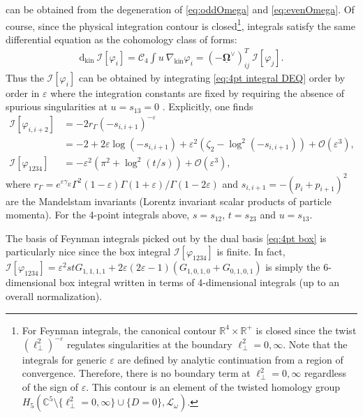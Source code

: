 \documentclass[11pt]{article}
\renewcommand{\d}{\text{d}}
\newcommand{\nn}{\nonumber}
\renewcommand{\O}{\mathcal{O}}
\newcommand{\vphi}{\varphi}
\newcommand{\vep}{\varepsilon}
\newcommand{\mat}[1]{\underline{\boldsymbol{#1}}}
\begin{document}
can be obtained from the degeneration of \eqref{eq:oddOmega} and \eqref{eq:evenOmega}. 
Of course, since the physical integration contour is closed\footnote{For Feynman integrals, the canonical contour $\mathbb{R}^4\times\mathbb{R}^+$ is closed since the twist $(\ell^2_\perp)^{-\vep}$ regulates singularities at the boundary $\ell_\perp^2=0,\infty$. Note that the integrals for generic $\vep$ are defined by analytic continuation from a region of convergence. Therefore, there is no boundary term at $\ell_\perp^2=0,\infty$ regardless of the sign of $\vep$. This contour is an element of the twisted homology group $H_5(\mathbb{C}^5\setminus\{\ell_\perp^2=0,\infty\}\cup\{D=0\},\mathcal{L}_\omega)$.}, integrals satisfy the same differential equation as the cohomology class of forms:
\begin{align} \label{eq:4pt integral DEQ}
	\d_\text{kin} \ \mathscr{I}[\vphi_i] 
	= \mathcal{C}_4 \int u\ \nabla_\text{kin} \vphi_i
	=  (-\mat{\Omega}^\vee)^T_{ij}\ \mathscr{I}[\vphi_j].
\end{align}
Thus the $\mathscr{I}[\vphi_i]$ can be obtained by integrating \eqref{eq:4pt integral DEQ} order by order in $\vep$ where the integration constants are fixed by requiring the absence of spurious singularities at $u=s_{13}=0$ \cite{Henn:2014qga}.
Explicitly, one  finds
\begin{align}
\label{eq:Ibub}
	\mathscr{I}[\vphi_{i,i+2}] 
	&= - 2 r_\Gamma(-s_{i,i+1})^{-\vep}
	\nn\\
	&= -2 + 2\vep \log(-s_{i,i+1}) 
	+ \vep^2 (\zeta_2{-}\log^2(-s_{i,i+1}))
	+ \O(\vep^3),
	\\
	\label{eq:Ibox massless}
	\mathscr{I}[\vphi_{1234}] & = - \vep^2 \left(\pi^2 + \log^2(t/s) \right) + \mathcal{O}(\vep^3),
\end{align}
where $r_\Gamma = e^{\vep\gamma_E}\Gamma^2(1-\vep)\Gamma(1+\vep)/\Gamma(1-2\vep)$ 
and $s_{i,i+1} = -(p_i + p_{i+1})^2$ are the Mandelstam invariants (Lorentz invariant scalar products of particle momenta).
For the 4-point integrals above, $s = s_{12}$, $t = s_{23}$ and $u=s_{13}$.

The basis of Feynman integrals picked out by the dual basis \eqref{eq:4pt box} is particularly nice since the box integral $\mathscr{I}[\vphi_{1234}]$ is finite. In fact, 
$\mathscr{I}[\vphi_{1234}] = \vep^2 st G_{1,1,1,1} + 2\vep(2\vep-1) (G_{1,0,1,0}+G_{0,1,0,1})$ 
is simply the 6-dimensional box integral written in terms of  4-dimensional integrals (up to an overall normalization).
\end{document}
